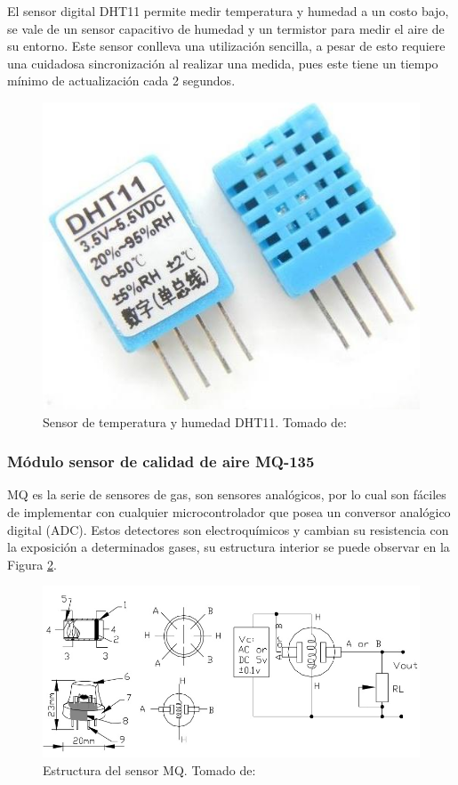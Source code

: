 El sensor digital DHT11 permite medir temperatura y humedad a un costo bajo, se vale de un sensor capacitivo de humedad y un termistor para medir el aire de su entorno. Este sensor conlleva una utilización sencilla, a pesar de esto requiere una cuidadosa sincronización al realizar una medida, pues este tiene un tiempo mínimo de actualización cada 2 segundos. \cite{DHT11}\\

\begin{figure}[H]
	\centering
	\caption[Sensor de temperatura y humedad DHT11.]{Sensor de temperatura y humedad DHT11. Tomado de: \cite{DHT11}}
	\label{fig:dht11}
	\includegraphics[width=0.4\linewidth]{Imagenes/dht11}
\end{figure}

\subsubsection{Módulo sensor de calidad de aire MQ-135}

MQ es la serie de sensores de gas, son sensores analógicos, por lo cual son fáciles de implementar con cualquier microcontrolador que posea un conversor analógico digital (ADC). Estos detectores son electroquímicos y cambian su resistencia con la exposición a determinados gases, su estructura interior se puede observar en la Figura \ref{fig:estructura-del-sensor-mq}.\cite{MQ1}

\begin{figure}[H]
	\centering
	\caption[Estructura del sensor MQ.]{Estructura del sensor MQ. Tomado de: \cite{MQ1}}
	\label{fig:estructura-del-sensor-mq}
	\includegraphics[width=0.7\linewidth]{Imagenes/Estructura_del_sensor_MQ}
\end{figure}


